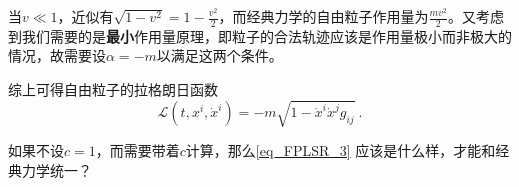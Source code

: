 当$v\ll 1$，近似有$\sqrt{1-v^2}=1-\frac{v^2}{2}$，而经典力学的自由粒子作用量为$\frac{mv^2}{2}$。又考虑到我们需要的是\textbf{最小}作用量原理，即粒子的合法轨迹应该是作用量极小而非极大的情况，故需要设$\alpha=-m$以满足这两个条件。

综上可得自由粒子的拉格朗日函数
\begin{equation}\label{eq_FPLSR_3}
\mathcal{L}(t, x^i, \dot{x}^i) = -m\sqrt{1-\dot{x}^i\dot{x}^jg_{ij}}~.
\end{equation}

\begin{exercise}{}
如果不设$c=1$，而需要带着$c$计算，那么\autoref{eq_FPLSR_3} 应该是什么样，才能和经典力学统一？
\end{exercise}